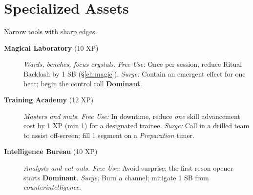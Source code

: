 \section{Specialized Assets}
Narrow tools with sharp edges.
\begin{description}
  \item[\textbf{Magical Laboratory} (10 XP)]  \emph{Wards, benches, focus crystals.} \emph{Free Use:} Once per session, reduce Ritual Backlash by 1 SB (\S\ref{ch:magic}). \emph{Surge:} Contain an emergent effect for one beat; begin the control roll \textbf{Dominant}.

  \item[\textbf{Training Academy} (12 XP)]  \emph{Masters and mats.} \emph{Free Use:} In downtime, reduce \emph{one} skill advancement cost by 1 XP (min 1) for a designated trainee. \emph{Surge:} Call in a drilled team to assist off-screen; fill 1 segment on a \emph{Preparation} timer.

  \item[\textbf{Intelligence Bureau} (10 XP)]  \emph{Analysts and cut-outs.} \emph{Free Use:} Avoid surprise; the first recon opener starts \textbf{Dominant}. \emph{Surge:} Burn a channel; mitigate 1 SB from \emph{counterintelligence}.
\end{description}

